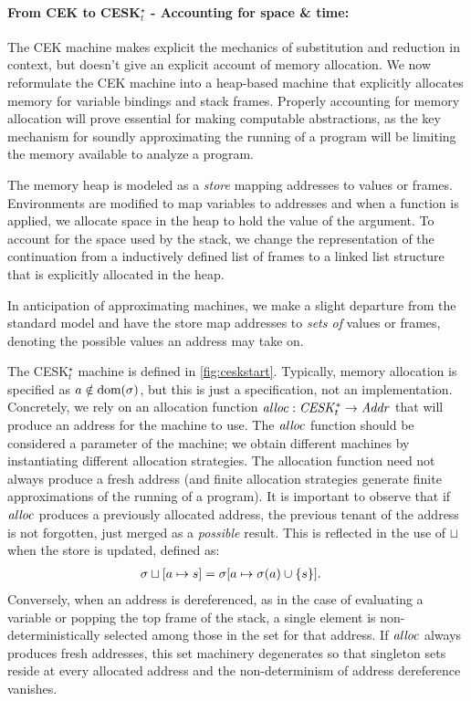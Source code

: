 \paragraph{From CEK to CESK$_t^\star$ - Accounting for space \& time:}

The CEK machine makes explicit the mechanics of substitution and
reduction in context, but doesn't give an explicit account of memory
allocation.  We now reformulate the CEK machine into a heap-based
machine that explicitly allocates memory for variable bindings and
stack frames.  Properly accounting for memory allocation will prove
essential for making computable abstractions, as the key mechanism for
soundly approximating the running of a program will be limiting the
memory available to analyze a program.

The memory heap is modeled as a \emph{store} mapping addresses to
values or frames.  Environments are modified to map variables to
addresses and when a function is applied, we allocate space in the
heap to hold the value of the argument.
%
To account for the space used by the stack, we change the
representation of the continuation from a inductively defined list of
frames to a linked list structure that is explicitly allocated in the
heap.

In anticipation of approximating machines, we make a slight
departure from the standard model and have the store map addresses to
\emph{sets of} values or frames, denoting the possible values an address may take on.


The CESK$_t^\star$ machine is defined in \autoref{fig:ceskstart}.
%
%
Typically, memory allocation is specified as $a \notin \text{dom}(\sigma)$, but this is just a specification, not an implementation.
%
Concretely, we rely on an allocation function $\mathit{alloc} : \mathit{CESK^*_t} \to \mathit{Addr}$ that will produce an address for the machine to use.
%
The $\mathit{alloc}$ function should be considered a parameter of the machine; we 
obtain different machines by instantiating different allocation strategies.
%
The allocation function need not always produce a fresh address (and finite
allocation strategies generate finite approximations of the running of a program).
%
It is important to observe that if $\mathit{alloc}$ produces a previously
allocated address, the previous tenant of the address is not
forgotten, just merged as a \emph{possible} result.  This is reflected
in the use of $\sqcup$ when the store is updated, defined as:
\begin{align*}
  \sigma\sqcup[a \mapsto s] &= \sigma[a \mapsto \sigma(a)\cup\{ s \}]\text.
\end{align*}
Conversely, when an address is dereferenced, as in the case of
evaluating a variable or popping the top frame of the stack, a single
element is non-deterministically selected among those in the set for
that address.  If $\mathit{alloc}$ always produces fresh addresses, this set
machinery degenerates so that singleton sets reside at every allocated
address and the non-determinism of address dereference vanishes.

